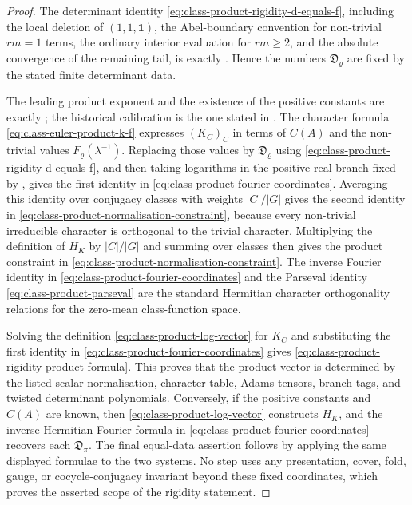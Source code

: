 \documentclass[11pt,a4paper]{amsart}
\theoremstyle{plain}
\theoremstyle{definition}
\theoremstyle{remark}
\begin{document}
\begin{proof}
  The determinant identity
  \eqref{eq:class-product-rigidity-d-equals-f}, including the local deletion
  of \((1,1,\mathbf1)\), the Abel-boundary convention for non-trivial
  \(rm=1\) terms, the ordinary interior evaluation for \(rm\ge2\), and the
  absolute convergence of the remaining tail, is exactly
  .  Hence the numbers
  \(\mathfrak D_\varrho\) are fixed by the stated finite determinant data.

  The leading product exponent and the existence of the positive constants
  are exactly ; the historical
  calibration is the one stated in .
  The character formula \eqref{eq:class-euler-product-k-f} expresses
  \((K_C)_C\) in terms of \(C(A)\) and the non-trivial values
  \(F_\varrho(\lambda^{-1})\).  Replacing those values by
  \(\mathfrak D_\varrho\) using
  \eqref{eq:class-product-rigidity-d-equals-f}, and then taking logarithms in
  the positive real branch fixed by ,
  gives the first identity in \eqref{eq:class-product-fourier-coordinates}.
  Averaging this identity over conjugacy classes with weights \(|C|/|G|\)
  gives the second identity in
  \eqref{eq:class-product-normalisation-constraint}, because every
  non-trivial irreducible character is orthogonal to the trivial character.
  Multiplying the definition of \(H_K\) by \(|C|/|G|\) and summing over
  classes then gives the product constraint in
  \eqref{eq:class-product-normalisation-constraint}.  The inverse Fourier
  identity in \eqref{eq:class-product-fourier-coordinates} and the Parseval
  identity \eqref{eq:class-product-parseval} are the standard Hermitian
  character orthogonality relations for the zero-mean class-function space.

  Solving the definition \eqref{eq:class-product-log-vector} for \(K_C\) and
  substituting the first identity in
  \eqref{eq:class-product-fourier-coordinates} gives
  \eqref{eq:class-product-rigidity-product-formula}.  This proves that the
  product vector is determined by the listed scalar normalisation, character
  table, Adams tensors, branch tags, and twisted determinant polynomials.
  Conversely, if the positive constants and \(C(A)\) are known, then
  \eqref{eq:class-product-log-vector} constructs \(H_K\), and the inverse
  Hermitian Fourier formula in \eqref{eq:class-product-fourier-coordinates}
  recovers each \(\mathfrak D_\pi\).  The final equal-data assertion follows
  by applying the same displayed formulae to the two systems.  No step uses
  any presentation, cover, fold, gauge, or cocycle-conjugacy invariant beyond
  these fixed coordinates, which proves the asserted scope of the rigidity
  statement.
\end{proof}
\end{document}
